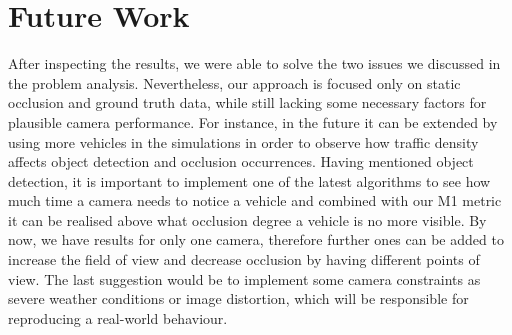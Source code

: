 \section{Future Work}

After inspecting the results, we were able to solve the two issues we discussed in the problem analysis. Nevertheless, our approach is focused only on static occlusion and ground truth data, while still lacking some necessary factors for plausible camera performance. For instance, in the future it can be extended by using more vehicles in the simulations in order to observe how traffic density affects object detection and occlusion occurrences. Having mentioned object detection, it is important to implement one of the latest algorithms to see how much time a camera needs to notice a vehicle and combined with our M1 metric it can be realised above what occlusion degree a vehicle is no more visible. By now, we have results for only one camera, therefore further ones can be added to increase the field of view and decrease occlusion by having different points of view. The last suggestion would be to implement some camera constraints as severe weather conditions or image distortion, which will be responsible for reproducing a real-world behaviour.